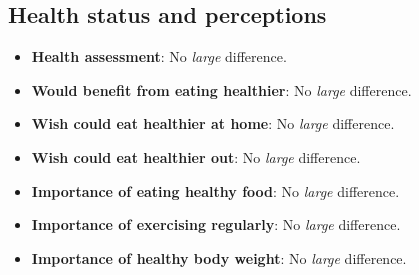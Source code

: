 \documentclass[12pt]{article}
\begin{document}
\clearpage

\subsection{Health status and perceptions}

\begin{itemize}
  \item \textbf{Health assessment}: No \emph{large} difference.

  \item \textbf{Would benefit from eating healthier}: No \emph{large} difference.

  \item \textbf{Wish could eat healthier at home}: No \emph{large} difference.

  \item \textbf{Wish could eat healthier out}: No \emph{large} difference.

  \item \textbf{Importance of eating healthy food}: No \emph{large} difference.

  \item \textbf{Importance of exercising regularly}: No \emph{large} difference.

  \item \textbf{Importance of healthy body weight}: No \emph{large} difference.
\end{itemize}
\end{document}
